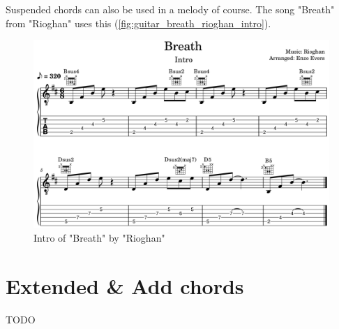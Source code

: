 \newpage

Suspended chords can also be used in a melody of course. The song "Breath" from "Rioghan" uses this (\autoref{fig:guitar_breath_rioghan_intro}).

\begin{figure}[h]
	\centering
	\includegraphics[width=\textwidth]{../../MuseScore/Guitar/GuitarBreathRioghanIntro.png}
	\caption{Intro of "Breath" by "Rioghan"}
	\label{fig:guitar_breath_rioghan_intro}
\end{figure}



\newpage

\section{Extended \& Add chords}
TODO
